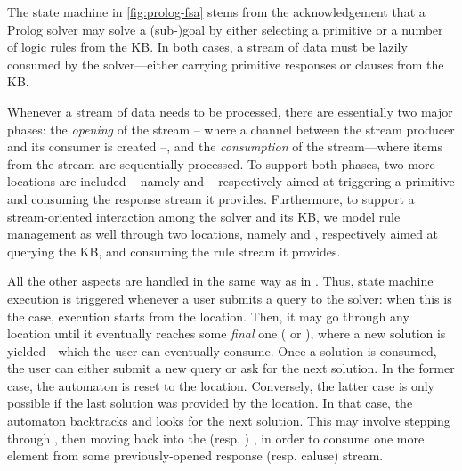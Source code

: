 \documentclass[12pt,a4paper,openright,twoside]{book}
\begin{document}
The state machine in \cref{fig:prolog-fsa} stems from the acknowledgement that a Prolog solver may solve a (sub-)goal by either selecting a primitive or a number of logic rules from the KB.
%
In both cases, a stream of data must be lazily consumed by the solver---either carrying primitive responses or clauses from the KB.

Whenever a stream of data needs to be processed, there are essentially two major phases: the \emph{opening} of the stream -- where a channel between the stream producer and its consumer is created --, and the \emph{consumption} of the stream---where items from the stream are sequentially processed.
%
To support both phases, two more locations are included -- namely  and  -- respectively aimed at triggering a primitive and consuming the response stream it provides.
%
Furthermore, to support a stream-oriented interaction among the solver and its KB, we model rule management as well through two locations, namely  and , respectively aimed at querying the KB, and consuming the rule stream it provides.

All the other aspects are handled in the same way as in \cite{tuprolog-sac08}.
%
Thus, state machine execution is triggered whenever a user submits a query to the solver: when this is the case, execution starts from the  location.
%
Then, it may go through any location until it eventually reaches some \emph{final} one ( or ), where a new solution is yielded---which the user can eventually consume.
%
Once a solution is consumed, the user can either submit a new query or ask for the next solution.
%
In the former case, the automaton is reset to the  location.
%
Conversely, the latter case is only possible if the last solution was provided by the  location.
%
In that case, the automaton backtracks and looks for the next solution.
%
This may involve stepping through , then moving back into the  (resp. ) , in order to consume one more element from some previously-opened response (resp. caluse) stream.
\end{document}
